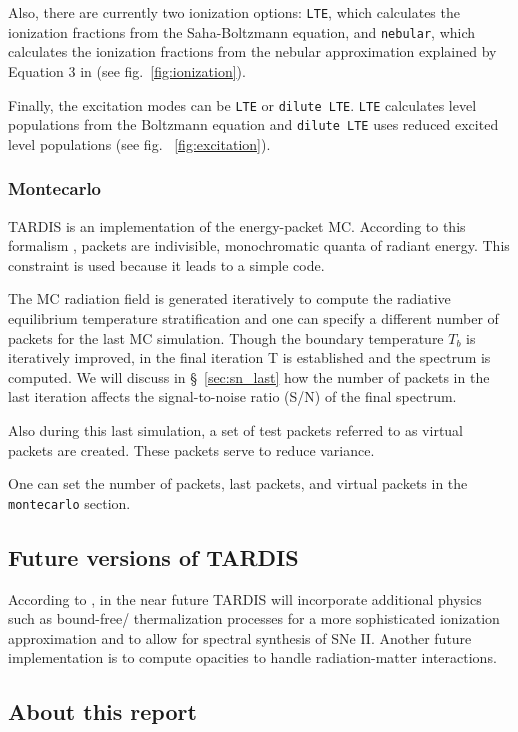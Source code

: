 \documentclass[letterpaper,12pt]{article}
\begin{document}
Also, there are currently two ionization options: \texttt{LTE}, which calculates the ionization fractions from the Saha-Boltzmann equation, and \texttt{nebular}, which calculates the ionization fractions from the nebular approximation explained by Equation 3 in \cite{tardis}(see fig.~\ref{fig:ionization}). 

Finally, the excitation modes can be \texttt{LTE} or \texttt{dilute LTE}. \texttt{LTE} calculates level populations from the Boltzmann equation and \texttt{dilute LTE} uses reduced excited level populations (see fig. ~\ref{fig:excitation}).

\subsubsection{\label{sec:config_monte}Montecarlo}

TARDIS is an implementation of the energy-packet MC. According to this formalism \cite{lucy} \cite{lucy_2002} \cite{lucy_2003}, packets are indivisible, monochromatic quanta of radiant energy. This constraint is used because it leads to a simple code. 

The MC radiation field is generated iteratively to compute the radiative equilibrium temperature stratification and one can specify a different number of packets for the last MC simulation. Though the boundary temperature $T_{b}$ is iteratively improved, in the final iteration T is established and the spectrum is computed. We will discuss in \S ~\ref{sec:sn_last} how the number of packets in the last iteration affects the signal-to-noise ratio (S/N) of the final spectrum.

Also during this last simulation, a set of test packets referred to as virtual packets are created. These packets serve to reduce variance. 
  
One can set the number of packets, last packets, and virtual packets in the  \texttt{montecarlo} section.

\subsection{Future versions of TARDIS}
According to \cite{tardis}, in the near future TARDIS will incorporate additional physics such as bound-free/ thermalization processes for a more sophisticated ionization approximation and to allow for spectral synthesis of SNe II. Another future implementation is to compute opacities to handle radiation-matter interactions.

\subsection{\label{sec:about_report} About this report}
\end{document}

